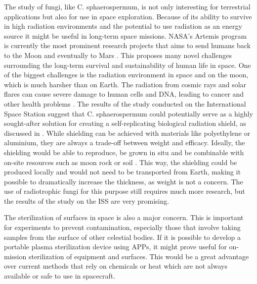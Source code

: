 The study of fungi, like C. sphaerospermum, is not only interesting for terrestrial applications but also for use in space exploration. Because of its ability to survive in high radiation environments and the potential to use radiation as an energy source it might be useful in long-term space missions. NASA's Artemis program is currently the most prominent research projects that aims to send humans back to the Moon and eventually to Mars \cite{artemis}. This proposes many novel challenges surrounding the long-term survival and sustainability of human life in space. One of the biggest challenges is the radiation environment in space and on the moon, which is much harsher than on Earth. The radiation from cosmic rays and solar flares can cause severe damage to human cells and DNA, leading to cancer and other health problems \cite{shield}. The results of the study conducted on the International Space Station \cite{iss} suggest that C. sphaerospermum could potentially serve as a highly sought-after solution for creating a self-replicating biological radiation shield, as discussed in \cite{shield}. While shielding can be achieved with materials like polyethylene or aluminium, they are always a trade-off between weight and efficacy. Ideally, the shielding would be able to reproduce, be grown in situ and be combinable with on-site resources such as moon rock or soil \cite{shield}. This way, the shielding could be produced locally and would not need to be transported from Earth, making it possible to dramatically increase the thickness, as weight is not a concern. The use of radiotrophic fungi for this purpose still requires much more research, but the results of the study on the ISS are very promising.

The sterilization of surfaces in space is also a major concern. This is important for experiments to prevent contamination, especially those that involve taking samples from the surface of other celestial bodies. If it is possible to develop a portable plasma sterilization device using APPs, it might prove useful for on-mission sterilization of equipment and surfaces. This would be a great advantage over current methods that rely on chemicals or heat which are not always available or safe to use in spacecraft.

